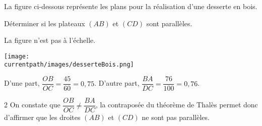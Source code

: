 \begin{exercice*}
    La figure ci-dessous représente les plans pour la réalisation d'une desserte en bois.

    Déterminer si les plateaux $(AB)$ et $(CD)$ sont parallèles.

    \begin{minipage}{1\linewidth}
    \begin{center}
        La figure n'est pas à l'échelle.

        \texttt{[image: \\currentpath/images/desserteBois.png]}    
    \end{center}
    \end{minipage}
    
    

\end{exercice*}
\begin{corrige}

    D'une part, $\dfrac{OB}{OC}=\dfrac{45}{60}=0,75$. \hspace*{10mm} D'autre part, $\dfrac{BA}{DC}=\dfrac{76}{100}=0,76$.

    \begin{spacing}2
    On constate que $\dfrac{OB}{OC}\neq\dfrac{BA}{DC}$, la contraposée du théorème de Thalès permet donc d'affirmer que les droites $(AB)$ et $(CD)$ ne sont pas parallèles.
    \end{spacing}
    
\end{corrige}

